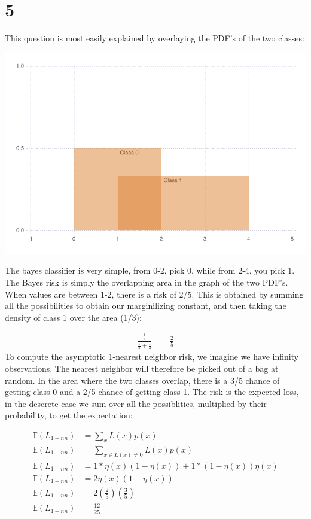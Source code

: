 \documentclass[a4paper,12pt]{article}
\begin{document}
\section*{5}
This question is most easily explained by overlaying the PDF's of the two classes:

\includegraphics[width=\linewidth]{figures/weave-test_1_1.pdf}

The bayes classifier is very simple, from 0-2, pick 0, while from 2-4, you pick 1. The Bayes risk is simply the overlapping area in the graph of the two PDF's. When values are between 1-2, there is a risk of 2/5. This is obtained by summing all the possibilities to obtain our marginilizing constant, and then taking the density of class 1 over the area (1/3):

\begin{align*}
\frac{\frac{1}{3}}{\frac{1}{3} + \frac{1}{2}} &= \frac{2}{5}
\end{align*}
%
To compute the asymptotic 1-nearest neighbor risk, we imagine we have infinity observations. The nearest neighbor will therefore be picked out of a bag at random. In the area where the two classes overlap, there is a 3/5 chance of getting class 0 and a 2/5 chance of getting class 1. The risk is the expected loss, in the descrete case we sum over all the possiblities, multiplied by their probability, to get the expectation:

\begin{align*}
\mathbb{E}(L_{1-nn}) &= \sum_x L(x)p(x) \\
\mathbb{E}(L_{1-nn}) &= \sum_{x \in L(x) \neq 0 } L(x)p(x) \\
\mathbb{E}(L_{1-nn}) &= 1*\eta(x)(1-\eta(x)) + 1*(1-\eta(x))\eta(x) \\
\mathbb{E}(L_{1-nn}) &= 2\eta(x)(1-\eta(x)) \\
\mathbb{E}(L_{1-nn}) &= 2(\frac{2}{5})(\frac{3}{5}) \\
\mathbb{E}(L_{1-nn}) &= \frac{12}{25}
\end{align*}
\end{document}
